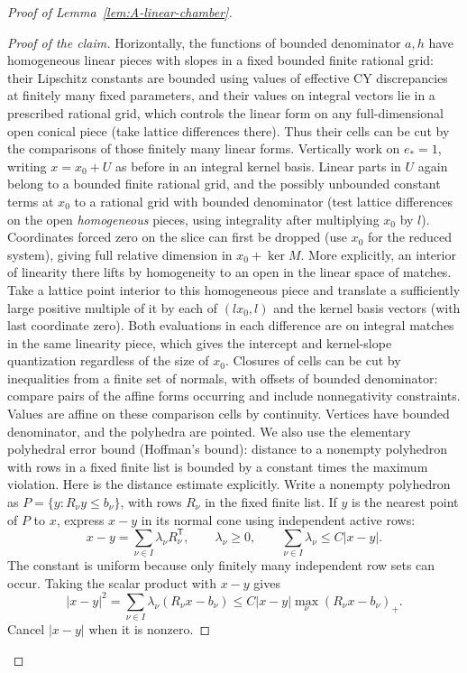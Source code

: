 \begin{proof}[Proof of Lemma~\ref{lem:A-linear-chamber}]
\begin{proof}[Proof of the claim]
Horizontally, the functions of bounded denominator \(a,h\) have homogeneous linear pieces with slopes in a fixed bounded finite rational grid: their Lipschitz constants are bounded using values of effective CY discrepancies at finitely many fixed parameters, and their values on integral vectors lie in a prescribed rational grid, which controls the linear form on any full-dimensional open conical piece (take lattice differences there).
Thus their cells can be cut by the comparisons of those finitely many linear forms.
Vertically work on \(e_*=1\), writing \(x=x_0+U\) as before in an integral kernel basis.
Linear parts in \(U\) again belong to a bounded finite rational grid, and the possibly unbounded constant terms at \(x_0\) to a rational grid with bounded denominator (test lattice differences on the open \emph{homogeneous} pieces, using integrality after multiplying \(x_0\) by \(l\)).
Coordinates forced zero on the slice can first be dropped (use \(x_0\) for the reduced system), giving full relative dimension in \(x_0+\ker M\).
More explicitly, an interior of linearity there lifts by homogeneity to an open in the linear space of matches.
Take a lattice point interior to this homogeneous piece and translate a sufficiently large positive multiple of it by each of \((l x_0,l)\) and the kernel basis vectors (with last coordinate zero).
Both evaluations in each difference are on integral matches in the same linearity piece, which gives the intercept and kernel-slope quantization regardless of the size of \(x_0\).
Closures of cells can be cut by inequalities from a finite set of normals, with offsets of bounded denominator: compare pairs of the affine forms occurring and include nonnegativity constraints.
Values are affine on these comparison cells by continuity.
Vertices have bounded denominator, and the polyhedra are pointed.
We also use the elementary polyhedral error bound (Hoffman's bound): distance to a nonempty polyhedron with rows in a fixed finite list is bounded by a constant times the maximum violation.
Here is the distance estimate explicitly.  Write a nonempty polyhedron
as \(P=\{y:R_\nu y\le b_\nu\}\), with rows \(R_\nu\) in the
fixed finite list.  If \(y\) is the nearest point of \(P\) to \(x\),
express \(x-y\) in its normal cone using independent active rows:
\[
 x-y=\sum_{\nu\in I}\lambda_\nu R_\nu^{\mathsf T},
 \qquad \lambda_\nu\ge0,\qquad
 \sum_{\nu\in I}\lambda_\nu\le C\lvert x-y\rvert .
\]
The constant is uniform because only finitely many independent row
sets can occur.  Taking the scalar product with \(x-y\) gives
\[
 \lvert x-y\rvert^2
   =\sum_{\nu\in I}\lambda_\nu(R_\nu x-b_\nu)
   \le C\lvert x-y\rvert
      \max_\nu(R_\nu x-b_\nu)_+.
\]
Cancel \(\lvert x-y\rvert\) when it is nonzero.
\end{proof}


\end{proof}
